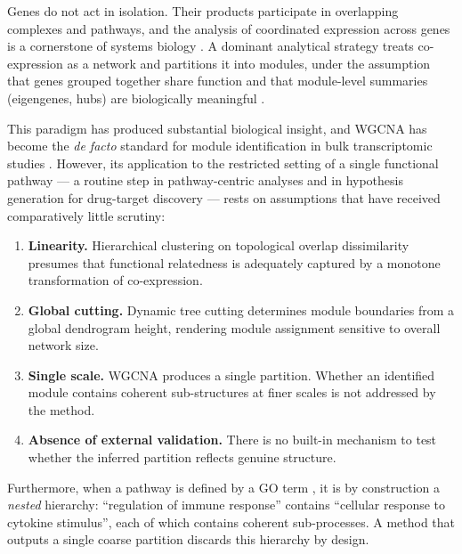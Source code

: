 \documentclass[twocolumn,10pt,a4paper]{article}
\begin{document}
Genes do not act in isolation. Their products participate in overlapping complexes and
pathways, and the analysis of coordinated expression across genes is a cornerstone of
systems biology \citep{fortunato2010review}. A dominant analytical strategy treats co-expression as a network and
partitions it into modules, under the assumption that genes grouped together share
function and that module-level summaries (eigengenes, hubs) are biologically meaningful
\citep{langfelder2008wgcna}.

This paradigm has produced substantial biological insight, and WGCNA has become the
\emph{de facto} standard for module identification in bulk transcriptomic studies
\citep{langfelder2008wgcna,langfelder2012wgcna,gillis2012guilt}.
However, its application to the restricted setting of a single functional pathway --- a
routine step in pathway-centric analyses and in hypothesis generation for drug-target
discovery --- rests on assumptions that have received comparatively little scrutiny:

\begin{enumerate}
\item \textbf{Linearity.} Hierarchical clustering on topological overlap dissimilarity
presumes that functional relatedness is adequately captured by a monotone transformation
of co-expression.
\item \textbf{Global cutting.} Dynamic tree cutting determines module boundaries from a
global dendrogram height, rendering module assignment sensitive to overall network size.
\item \textbf{Single scale.} WGCNA produces a single partition. Whether an identified
module contains coherent sub-structures at finer scales is not addressed by the method.
\item \textbf{Absence of external validation.} There is no built-in mechanism to test
whether the inferred partition reflects genuine structure.
\end{enumerate}

Furthermore, when a pathway is defined by a GO term \citep{ashburner2000go}, it is by
construction a \emph{nested} hierarchy: ``regulation of immune response'' contains ``cellular response to cytokine
stimulus'', each of which contains coherent sub-processes. A method that outputs a single
coarse partition discards this hierarchy by design.
\end{document}
